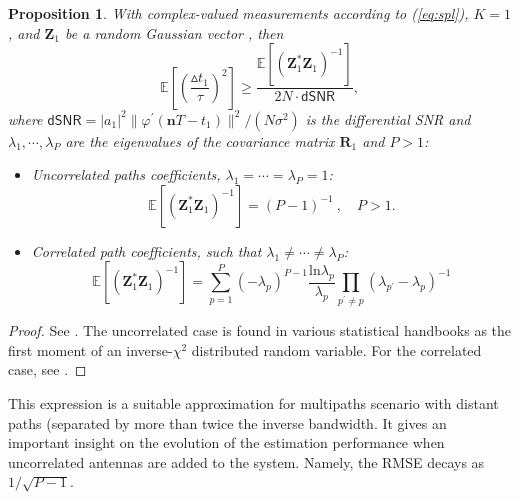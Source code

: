 \documentclass[journal,10pt]{IEEEtran}
\providecommand{\Esp}[1]{\mathbb{E}\left[#1\right]}
\providecommand{\mat}[1]{\boldsymbol{#1}}
\providecommand{\vct}[1]{\boldsymbol{#1}}
\newtheorem{proposition}{Proposition}
\begin{document}
\begin{proposition}\label{prop:crbp}
With complex-valued measurements according to (\ref{eq:spl}), $K=1$, and $\vct Z_1$ be a random Gaussian vector , then
\begin{equation}\Esp{(\frac{\vartriangle\!\! t_1}{\tau})^2}\geq\frac{\Esp{\left(\vct Z_1^\ast \vct Z_1\right)^{-1}}}{2N\cdot \textsf{dSNR}},\end{equation}
where $\textsf{dSNR}=|a_1|^2\|\varphi^\prime(\vct nT-t_1)\|^2/(N\sigma^2)$ is the differential SNR and $\lambda_1,\cdots,\lambda_P$ are the eigenvalues of the covariance matrix $\mat R_1$ and $P>1$:
\begin{itemize}
\item Uncorrelated paths coefficients, $\lambda_1=\cdots=\lambda_P=1$:
\begin{equation*}
\Esp{\left(\vct Z_1^\ast \vct Z_1\right)^{-1}}=(P-1)^{-1}\ ,\quad P>1.
\end{equation*}
\item Correlated path coefficients, such that $\lambda_1\neq\cdots\neq\lambda_P$:
\begin{equation*}
\Esp{\left(\vct Z_1^\ast \vct Z_1\right)^{-1}}=\sum_{p=1}^P (-\lambda_p)^{P-1}\frac{\mathrm{ln} \lambda_p}{\lambda_p}\prod_{p^\prime\neq p}\left( \lambda_{p^\prime} -\lambda_p\right)^{-1}
\end{equation*}
\end{itemize}
\end{proposition}\begin{proof}See \cite{Barbotin2010}. The uncorrelated case is found in various statistical handbooks as the first moment of an inverse-$\chi^2$ distributed random variable. For the correlated case, see \cite{Thomas1976}.\end{proof}
This expression is a suitable approximation for multipaths  scenario with distant paths (separated by more than twice the inverse bandwidth.
It gives an important insight on the evolution of the estimation performance when uncorrelated antennas are added to the system. Namely, the RMSE decays as $1/\sqrt{P-1}$.
\end{document}
